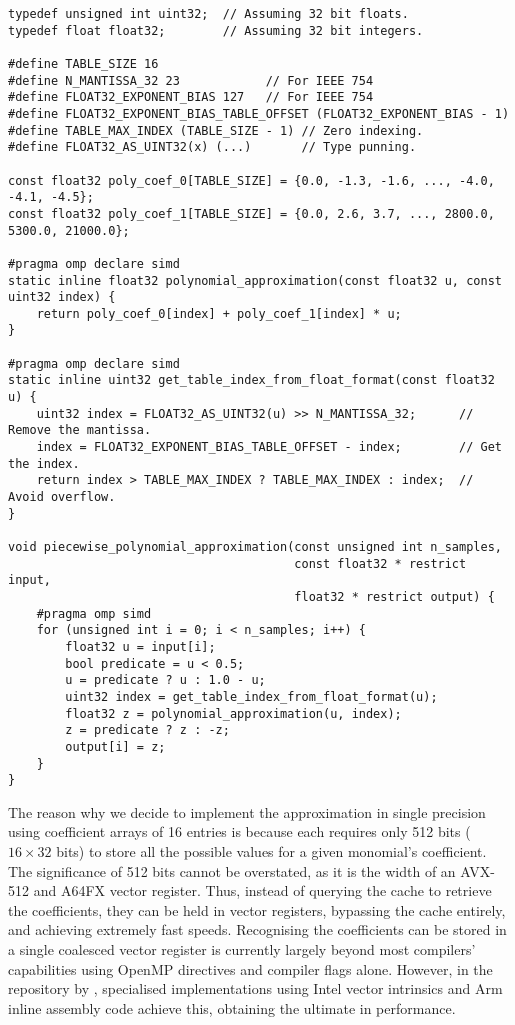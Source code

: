 \documentclass[manuscript,review]{acmart}
\begin{document}
\begin{lstfloat}[h!tb]
\begin{lstlisting}[style=C, caption={C implementation of the piecewise linear approximation.}, label={code:piecewise_linear_approximation}]
typedef unsigned int uint32;  // Assuming 32 bit floats. 
typedef float float32;        // Assuming 32 bit integers. 

#define TABLE_SIZE 16
#define N_MANTISSA_32 23            // For IEEE 754
#define FLOAT32_EXPONENT_BIAS 127   // For IEEE 754
#define FLOAT32_EXPONENT_BIAS_TABLE_OFFSET (FLOAT32_EXPONENT_BIAS - 1)
#define TABLE_MAX_INDEX (TABLE_SIZE - 1) // Zero indexing.
#define FLOAT32_AS_UINT32(x) (...)       // Type punning.

const float32 poly_coef_0[TABLE_SIZE] = {0.0, -1.3, -1.6, ..., -4.0, -4.1, -4.5};
const float32 poly_coef_1[TABLE_SIZE] = {0.0, 2.6, 3.7, ..., 2800.0, 5300.0, 21000.0};

#pragma omp declare simd
static inline float32 polynomial_approximation(const float32 u, const uint32 index) {
    return poly_coef_0[index] + poly_coef_1[index] * u;
}

#pragma omp declare simd
static inline uint32 get_table_index_from_float_format(const float32 u) {
    uint32 index = FLOAT32_AS_UINT32(u) >> N_MANTISSA_32;      // Remove the mantissa.
    index = FLOAT32_EXPONENT_BIAS_TABLE_OFFSET - index;        // Get the index.
    return index > TABLE_MAX_INDEX ? TABLE_MAX_INDEX : index;  // Avoid overflow.
}

void piecewise_polynomial_approximation(const unsigned int n_samples,
                                        const float32 * restrict input, 
                                        float32 * restrict output) {
    #pragma omp simd 
    for (unsigned int i = 0; i < n_samples; i++) {
        float32 u = input[i];
        bool predicate = u < 0.5;
        u = predicate ? u : 1.0 - u;
        uint32 index = get_table_index_from_float_format(u);
        float32 z = polynomial_approximation(u, index);
        z = predicate ? z : -z;
        output[i] = z;
    }
}
\end{lstlisting}
\end{lstfloat}

The reason why we decide to implement the approximation in single precision using coefficient arrays of 16 entries is because each requires only 512 bits ($ 16 \times 32 $ bits) to store all the possible values for a given monomial's coefficient. The significance of 512 bits cannot be overstated, as it is the width of an AVX-512 and A64FX vector register. Thus, instead of querying the cache to retrieve the coefficients, they can be held in vector registers, bypassing the cache entirely, and achieving extremely fast speeds. Recognising the coefficients can be stored in a single coalesced vector register is currently largely beyond most compilers' capabilities using OpenMP directives and compiler flags alone. However, in the repository by \citet{sheridan2020approximate_random}, specialised implementations using Intel vector intrinsics and Arm inline assembly code achieve this, obtaining the ultimate in performance. 
\end{document}
